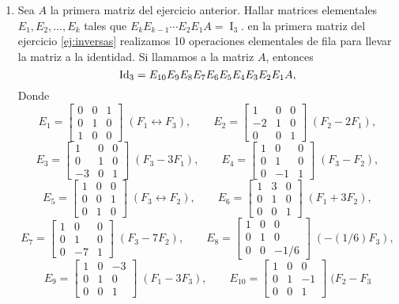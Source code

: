 \begin{enumerate}[topsep=6pt,itemsep=.4cm]
\item Sea $A$ la primera matriz del ejercicio anterior.
Hallar matrices elementales $E_1,E_2,\dots,E_k$ tales que $E_kE_{k-1}\cdots E_2E_1A=\operatorname{I}_3$.
\rta en  la primera matriz del ejercicio \ref{ej:inversas} realizamos 10 operaciones elementales de fila para llevar la matriz a la identidad. Si llamamos a la matriz $A$, entonces
$$
\operatorname{Id}_3= E_{10}E_9E_8E_7E_6E_5E_4E_3E_2E_1A,
$$
Donde 
$$
    E_1 = \begin{bmatrix} 0&0&1 \\    0&1&0 \\ 1&0&0\end{bmatrix}\;(F_1 \leftrightarrow F_3) ,\qquad
    E_2 = \begin{bmatrix} 1&0&0 \\    -2&1&0 \\ 0&0&1\end{bmatrix}\; (F_2-2F_1),
$$
$$    
    E_3 = \begin{bmatrix} 1&0&0 \\    0&1&0 \\ -3&0&1\end{bmatrix}\; (F_3-3F_1),\qquad 
    E_4 = \begin{bmatrix} 1&0&0 \\    0&1&0 \\ 0&-1&1\end{bmatrix}\; (F_3-F_2),
$$
$$
    E_5 = \begin{bmatrix} 1&0&0 \\    0&0&1 \\ 0&1&0\end{bmatrix}\; (F_3 \leftrightarrow F_2),\qquad 
    E_6 = \begin{bmatrix} 1&3&0 \\    0&1&0 \\ 0&0&1\end{bmatrix}\; (F_1 +3F_2),
$$
$$
    E_7 = \begin{bmatrix} 1&0&0 \\    0&1&0 \\ 0&-7&1\end{bmatrix}\; (F_3-7F_2),\qquad 
    E_8 = \begin{bmatrix} 1&0&0 \\    0&1&0 \\ 0&0&-1/6\end{bmatrix}\; (-(1/6)F_3),
$$
$$
    E_9 = \begin{bmatrix} 1&0&-3 \\    0&1&0 \\ 0&0&1\end{bmatrix}\; (F_1-3F_3),\qquad 
    E_{10} = \begin{bmatrix} 1&0&0 \\    0&1&-1 \\ 0&0&1\end{bmatrix}\; (F_2-F_3
$$


\end{enumerate}
